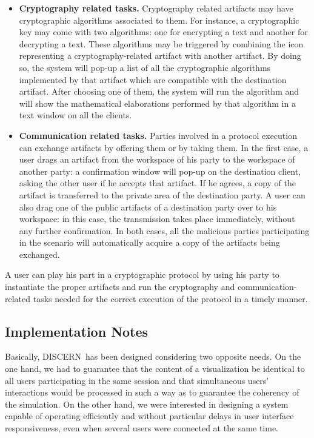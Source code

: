 \documentclass[conference]{IEEEtran}
\def\disgrace{DISCERN}
\begin{document}
\begin{itemize}
\item{\bf Cryptography related tasks.} Cryptography related artifacts
  may have cryptographic algorithms associated to them. For instance,
  a cryptographic key may come with two algorithms: one for encrypting
  a text and another for decrypting a text. These algorithms may be
  triggered by combining the icon representing a cryptography-related
  artifact with another artifact. By doing so, the system will pop-up
  a list of all the cryptographic algorithms implemented by that
  artifact which are compatible with the destination artifact. After
  choosing one of them, the system will run the algorithm and will
  show the mathematical elaborations performed by that algorithm in a
  text window on all the clients.

\item{\bf Communication related tasks.} Parties involved in a protocol
  execution can exchange artifacts by offering them or by taking
  them. In the first case, a user drags an artifact from the workspace
  of his party to the workspace of another party: a confirmation
  window will pop-up on the destination client, asking the other user
  if he accepts that artifact. If he agrees, a copy of the artifact is
  transferred to the private area of the destination party. A user can
  also drag one of the public artifacts of a destination party over to
  his workspace: in this case, the transmission takes place
  immediately, without any further confirmation. In both cases, all
  the malicious parties participating in the scenario will
  automatically acquire a copy of the artifacts being exchanged.
\end{itemize}

A user can play his part in a cryptographic protocol by using his
party to instantiate the proper artifacts and run the cryptography and
communication-related tasks needed for the correct execution of the
protocol in a timely manner.




\subsection{Implementation Notes}
Basically, \disgrace\ has been designed considering two opposite
needs. On the one hand, we had to guarantee that the content of a
visualization be identical to all users participating in the same
session and that simultaneous users' interactions would be processed
in such a way as to guarantee the coherency of the simulation. On the
other hand, we were interested in designing a system capable of
operating efficiently and without particular delays in user interface
responsiveness, even when several users were connected at the same
time.
\end{document}
